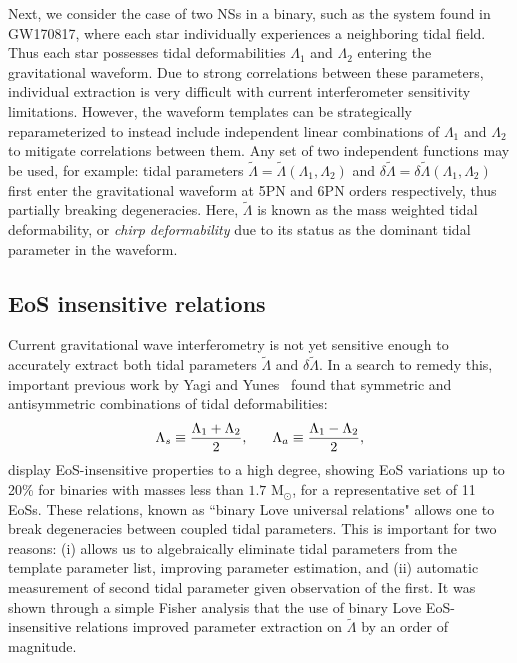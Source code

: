\documentclass[prd,twocolumn,nofootinbib,superscriptaddress,amsmath,amssymb]{revtex4-1}
\begin{document}
Next, we consider the case of two NSs in a binary, such as the system found in GW170817, where each star 
individually experiences a neighboring tidal field.
Thus each star possesses tidal deformabilities $\Lambda_1$ and $\Lambda_2$ entering the gravitational waveform.
Due to strong correlations between these parameters, individual extraction is very difficult with current interferometer sensitivity limitations.
However, the waveform templates can be strategically reparameterized to instead include independent linear combinations of $\Lambda_1$ and $\Lambda_2$ to mitigate correlations between them. 
Any set of two independent functions may be used, for example: tidal parameters $\tilde{\Lambda}=\tilde{\Lambda}(\Lambda_1,\Lambda_2)$ and $\delta \tilde{\Lambda}=\delta \tilde{\Lambda}(\Lambda_1,\Lambda_2)$~\cite{Wade:tidalCorrections} first enter the gravitational waveform at 5PN and 6PN orders respectively, thus partially breaking degeneracies.
Here, $\tilde{\Lambda}$ is known as the mass weighted tidal deformability, or \emph{chirp deformability} due to its status as the dominant tidal parameter in the waveform. 

\subsection{EoS insensitive relations}\label{sec:eosInsensitive}
Current gravitational wave interferometry is not yet sensitive enough to accurately extract both tidal parameters $\tilde{\Lambda}$ and $\delta\tilde{\Lambda}$.
In a search to remedy this, important previous work by Yagi and Yunes~\cite{Yagi:binLove} found that symmetric and antisymmetric combinations of tidal deformabilities:
\begin{equation}
\Lambda_s \equiv \frac{\Lambda_1 + \Lambda_2}{2}, \hspace{6mm} \Lambda_a \equiv \frac{\Lambda_1 - \Lambda_2}{2},
\end{equation}
display EoS-insensitive properties to a high degree, showing EoS variations up to 20\% for binaries with masses less than $1.7 \text{ M}_{\odot}$, for a representative set of 11 EoSs. 
These relations, known as ``binary Love universal relations" allows one to break degeneracies between coupled tidal parameters.
This is important for two reasons: (i) allows us to algebraically eliminate tidal parameters from the template parameter list, improving parameter estimation, and (ii) automatic measurement of second tidal parameter given observation of the first.
It was shown through a simple Fisher analysis that the use of binary Love EoS-insensitive relations improved parameter extraction on $\tilde{\Lambda}$ by an order of magnitude.
\end{document}
